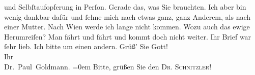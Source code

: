 \begin{ledgroupsized}[t]{13cm}
               und Selbſtaufopferung in Perſon. Gerade das, was Sie brauchten. Ich aber bin wenig
               dankbar dafür und ſehne mich nach etwas ganz, ganz Anderem, als nach einer
               Mutter.\pend
           \pstart
           Nach Wien werde ich lange nicht kommen. Wozu auch
               das ewige Herumreiſen? {\pb}Man fährt und fährt und
               kommt doch nicht weiter.\pend
           \pstart
           Ihr Brief war ſehr lieb. Ich bitte um einen andern.\pend
           \pstart
           Grüß’ Sie Gott! {\\[\baselineskip]}Ihr {\\[\baselineskip]}\spacefill\mbox{Dr. Paul Goldmann.}\pend
           \leftskip=0em{}\pstart
           \noindent{}Bitte, grüßen Sie den \textsc{Dr. Schnitzler}!\pend
           
         
         \endnumbering{}\end{ledgroupsized}\begin{anhang}\end{anhang}\newcommand{\dateiname}{L03538}\newcommand{\titel}{Paul Goldmann an Olga und Elisabeth Gussmann, 28. 12. [1900?]}\newcommand{\editorInnen}{Martin Anton Müller und Laura Untner}
      